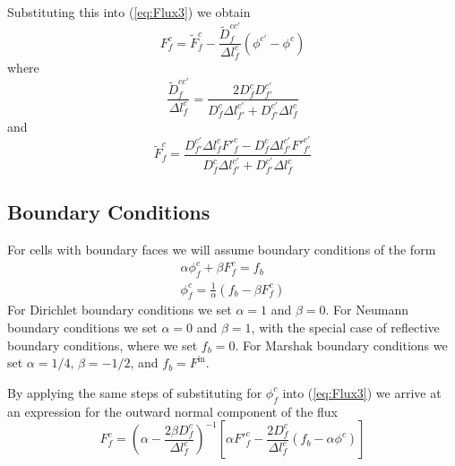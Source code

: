 \documentclass[12pt]{article}
\newcommand{\bfunc}{\ensuremath{f_{b}}}
\begin{document}
Substituting this into (\ref{eq:Flux3}) we obtain
\begin{equation}
    \boxed{
        F^{c}_{f} = 
        \tilde{F}^{c}_{f} -  \frac{\tilde{D}^{cc'}_{f}}{\Delta l^{c}_{f}}
                             \left( \phi^{c'} - \phi^{c} \right)
    }
\label{eq:Finterior}
\end{equation}
where
\begin{equation}
        \frac{\tilde{D}^{cc'}_{f}}{\Delta l^{c}_{f}}
                    = \frac{
                         2 D^{c}_{f} D^{c'}_{f'} 
                       }
                       {
                           D^{c}_{f}   \Delta l^{c'}_{f'}
                        +  D^{c'}_{f'} \Delta l^{c}_{f}
                       }
\end{equation}
and
\begin{equation}
    \tilde{F}^{c}_{f} = \frac
                        { D^{c'}_{f'} \Delta l^{c}_{f} {F'}^{c}_{f}
                            - D^{c}_{f} \Delta l^{c'}_{f'} {F'}^{c'}_{f'}
                        }
                        { D^{c}_{f} \Delta l^{c'}_{f'}
                            + D^{c'}_{f'} \Delta l^{c}_{f}
                        }
\end{equation}

\subsection{Boundary Conditions}

For cells with boundary faces we will assume boundary conditions of the
form
\begin{gather}
        \alpha \phi^{c}_{f} + \beta F^{c}_{f} = \bfunc
  \\
        \phi^{c}_{f} = \frac{1}{\alpha} \left( \bfunc - \beta F^{c}_{f} \right)
\label{eq:phicf_bc}
\end{gather}
For Dirichlet boundary conditions we set $\alpha=1$ and $\beta=0$.
For Neumann boundary conditions we set $\alpha=0$ and $\beta=1$,
 with the special
case of reflective boundary conditions, where we set $\bfunc = 0$.
For Marshak boundary conditions we set $\alpha=1/4$, $\beta=-1/2$, and
$\bfunc = F^{\text{in}}$.

By applying the same steps of substituting for $\phi^{c}_{f}$ into
(\ref{eq:Flux3})
we arrive at an expression for the outward normal component of the flux
\begin{equation}
   \boxed{
        F^{c}_{f} = \left( \alpha - \frac{2 \beta D^{c}_{f}}{\Delta l^{c}_{f}}
                    \right)^{-1}
                    \left[ \alpha {F'}^{c}_{f} - \frac{2 D^{c}_{f}}{\Delta l^{c}_{f}}
                                                \left(\bfunc - \alpha \phi^{c}\right)
                    \right]
   }
\label{eq:Fboundary}
\end{equation}
\end{document}
